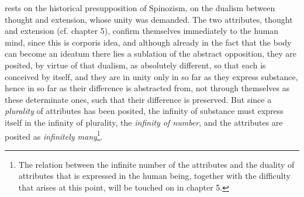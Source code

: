 \documentclass[12pt,a4paper,openany]{book}
\newcommand{\opage}[1]{\marginnote{\footnotesize\textit{[#1]}}}
\begin{document}
rests on the historical presupposition of Spinozism, on the dualism between
thought and extension, whose unity was demanded. The two attributes, thought
and extension (cf. chapter 5), confirm themselves immediately to the
human mind, since this is corporis idea, and although already in
the fact that the body can become an ideatum there lies a sublation of the
abstract opposition, they are posited, by virtue of that dualism, as absolutely
different, so that each is conceived by itself, and they are in
unity only in so far as they express substance, hence in so far as their
difference is abstracted from, not through themselves as these determinate ones, such that their
difference is preserved. But since a \emph{plurality} of
attributes has been posited, the infinity of substance must express
\opage{52}\setcounter{footnote}{0}itself in the infinity of plurality, the \emph{infinity of number}, and the attributes are posited
as \emph{infinitely many}\footnote{The relation between the infinite number of the
attributes and the duality of attributes that is expressed in the
human being, together with the difficulty that arises at this
point, will be touched on in chapter 5.}.
\end{document}
